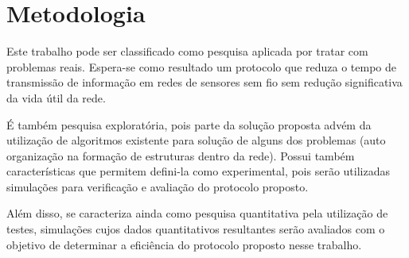 \section{Metodologia}

Este trabalho pode ser classificado como pesquisa aplicada por tratar com problemas reais. Espera-se como resultado um protocolo que reduza o tempo de transmissão de informação em redes de sensores sem fio sem redução significativa da vida útil da rede. 

É também pesquisa exploratória, pois parte da solução proposta advém da utilização de algoritmos existente para solução de alguns dos problemas (auto organização na formação de estruturas dentro da rede). Possui também características que permitem defini-la como experimental, pois serão utilizadas simulações para verificação e avaliação do protocolo proposto.

Além disso, se caracteriza ainda como pesquisa quantitativa pela utilização de testes, simulações cujos dados quantitativos resultantes serão avaliados com o objetivo de determinar a eficiência do protocolo proposto nesse trabalho.
